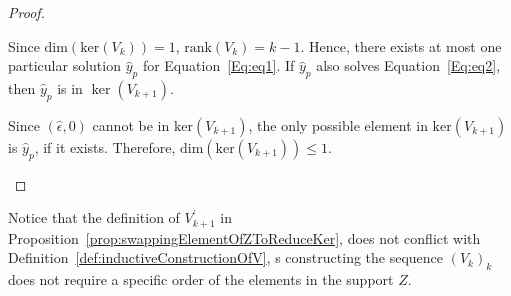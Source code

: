 \documentclass[11pt]{llncs}
\begin{document}
\begin{proof}
\begin{itemize}
\begin{itemize}


Since $\text{dim}(\text{ker}(V_k)) = 1$, $\text{rank}(V_k) = k-1$. Hence, there exists at most one particular solution $\hat{y}_p$ for Equation~\ref{Eq:eq1}. 
If \( \hat{y}_p \) also solves Equation~\ref{Eq:eq2}, then \( \hat{y}_p \) is in \( \ker(V_{k+1}) \).
 
\end{itemize}
Since $(\hat{\epsilon}, 0)$  cannot be in \( \text{ker}(V_{k+1}) \), the only possible element in \( \text{ker}(V_{k+1}) \) is \( \hat{y}_p \), if it exists. Therefore, \( \text{dim}(\text{ker}(V_{k+1})) \leq 1 \).
        \end{itemize}









\end{proof}


\begin{remark}
    Notice that the definition of $V^{'}_{k+1}$ in Proposition~\ref{prop:swappingElementOfZToReduceKer}, does not conflict with Definition~\ref{def:inductiveConstructionOfV}, s constructing the sequence $(V_{k})_k$ does not require a specific order of the elements in the support $Z$.   
\end{remark}
\end{document}
